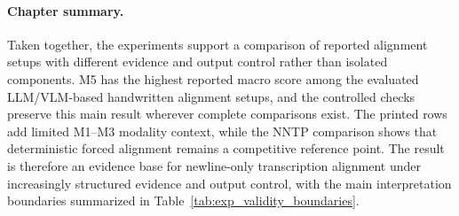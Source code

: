 \FloatBarrier

\paragraph{Chapter summary.}
\label{sec:experimentation_summary}

Taken together, the experiments support a comparison of reported alignment setups with different evidence and output control rather than isolated components. M5 has the highest reported macro score among the evaluated LLM/VLM-based handwritten alignment setups, and the controlled checks preserve this main result wherever complete comparisons exist. The printed rows add limited M1--M3 modality context, while the NNTP comparison shows that deterministic forced alignment remains a competitive reference point. The result is therefore an evidence base for newline-only transcription alignment under increasingly structured evidence and output control, with the main interpretation boundaries summarized in Table~\ref{tab:exp_validity_boundaries}.
